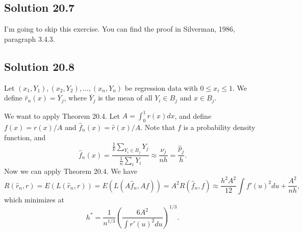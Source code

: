\subsection*{Solution 20.7}

I'm going to skip this exercise.
You can find the proof in Silverman, 1986, paragraph 3.4.3.


\subsection*{Solution 20.8}

Let $(x_1, Y_1), (x_2, Y_2), ..., (x_n, Y_n)$ be regression data with $0 \leq x_i \leq 1$.
We define $\hat{r}_n(x) = \overline{Y}_j$, where $\overline{Y}_j$ is the mean of all $Y_i \in B_j$ and $x \in B_j$.

We want to apply Theorem 20.4.
Let $A = \int_0^1 r(x) dx$, and define $f(x) = r(x) / A$ and $\hat{f}_n(x) = \hat{r}(x) / A$.
Note that $f$ is a probability density function, and
\begin{equation*}
    \hat{f}_n(x) = \frac{\frac{1}{k} \sum_{Y_i \in B_j} Y_j}{\frac{1}{n} \sum_{i} Y_i}
        \approx \frac{\nu_j}{nh}
        = \frac{\hat{p}_j}{h}.
\end{equation*}
Now we can apply Theorem 20.4.
We have
\begin{equation*}
    R(\hat{r}_n, r) = E(L(\hat{r}_n, r))
        = E(L(A \hat{f}_n, A f))
        = A^2 R(\hat{f}_n, f)
        \approx \frac{h^2 A^2}{12} \int f'(u)^2 du + \frac{A^2}{nh},
\end{equation*}
which minimizes at
\begin{equation*}
    h^* = \frac{1}{n^{1/3}} \left( \frac{6 A^2}{\int r'(u)^2 du} \right)^{1/3}.
\end{equation*}
